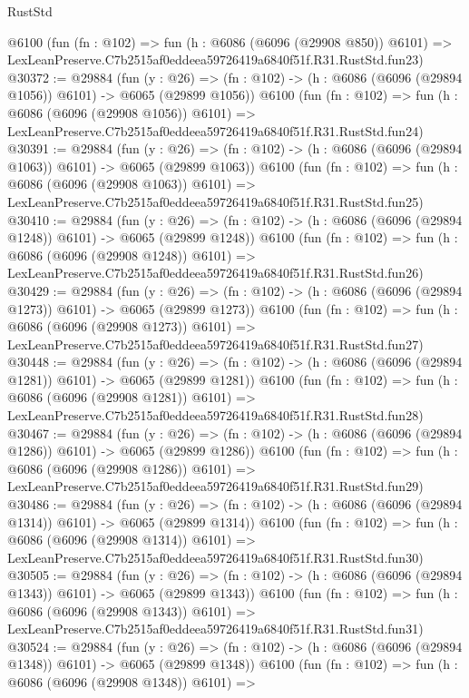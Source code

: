 \begin{lexlean}{RustStd}
\begin{coremodule}
    @6100
    (fun (fn : @102) =>
    fun (h : @6086 (@6096 (@29908 @850)) @6101) =>
    LexLeanPreserve.C7b2515af0eddeea59726419a6840f51f.R31.RustStd.fun23)
@30372 := @29884
    (fun (y : @26) =>
    (fn : @102) -> (h : @6086 (@6096 (@29894 @1056)) @6101) -> @6065 (@29899 @1056))
    @6100
    (fun (fn : @102) =>
    fun (h : @6086 (@6096 (@29908 @1056)) @6101) =>
    LexLeanPreserve.C7b2515af0eddeea59726419a6840f51f.R31.RustStd.fun24)
@30391 := @29884
    (fun (y : @26) =>
    (fn : @102) -> (h : @6086 (@6096 (@29894 @1063)) @6101) -> @6065 (@29899 @1063))
    @6100
    (fun (fn : @102) =>
    fun (h : @6086 (@6096 (@29908 @1063)) @6101) =>
    LexLeanPreserve.C7b2515af0eddeea59726419a6840f51f.R31.RustStd.fun25)
@30410 := @29884
    (fun (y : @26) =>
    (fn : @102) -> (h : @6086 (@6096 (@29894 @1248)) @6101) -> @6065 (@29899 @1248))
    @6100
    (fun (fn : @102) =>
    fun (h : @6086 (@6096 (@29908 @1248)) @6101) =>
    LexLeanPreserve.C7b2515af0eddeea59726419a6840f51f.R31.RustStd.fun26)
@30429 := @29884
    (fun (y : @26) =>
    (fn : @102) -> (h : @6086 (@6096 (@29894 @1273)) @6101) -> @6065 (@29899 @1273))
    @6100
    (fun (fn : @102) =>
    fun (h : @6086 (@6096 (@29908 @1273)) @6101) =>
    LexLeanPreserve.C7b2515af0eddeea59726419a6840f51f.R31.RustStd.fun27)
@30448 := @29884
    (fun (y : @26) =>
    (fn : @102) -> (h : @6086 (@6096 (@29894 @1281)) @6101) -> @6065 (@29899 @1281))
    @6100
    (fun (fn : @102) =>
    fun (h : @6086 (@6096 (@29908 @1281)) @6101) =>
    LexLeanPreserve.C7b2515af0eddeea59726419a6840f51f.R31.RustStd.fun28)
@30467 := @29884
    (fun (y : @26) =>
    (fn : @102) -> (h : @6086 (@6096 (@29894 @1286)) @6101) -> @6065 (@29899 @1286))
    @6100
    (fun (fn : @102) =>
    fun (h : @6086 (@6096 (@29908 @1286)) @6101) =>
    LexLeanPreserve.C7b2515af0eddeea59726419a6840f51f.R31.RustStd.fun29)
@30486 := @29884
    (fun (y : @26) =>
    (fn : @102) -> (h : @6086 (@6096 (@29894 @1314)) @6101) -> @6065 (@29899 @1314))
    @6100
    (fun (fn : @102) =>
    fun (h : @6086 (@6096 (@29908 @1314)) @6101) =>
    LexLeanPreserve.C7b2515af0eddeea59726419a6840f51f.R31.RustStd.fun30)
@30505 := @29884
    (fun (y : @26) =>
    (fn : @102) -> (h : @6086 (@6096 (@29894 @1343)) @6101) -> @6065 (@29899 @1343))
    @6100
    (fun (fn : @102) =>
    fun (h : @6086 (@6096 (@29908 @1343)) @6101) =>
    LexLeanPreserve.C7b2515af0eddeea59726419a6840f51f.R31.RustStd.fun31)
@30524 := @29884
    (fun (y : @26) =>
    (fn : @102) -> (h : @6086 (@6096 (@29894 @1348)) @6101) -> @6065 (@29899 @1348))
    @6100
    (fun (fn : @102) =>
    fun (h : @6086 (@6096 (@29908 @1348)) @6101) =>

\end{coremodule}
\end{lexlean}
